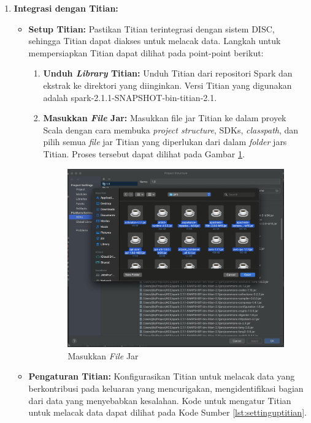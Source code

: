 \begin{enumerate}[topsep=0pt, itemsep=0pt]
  \item \textbf{Integrasi dengan Titian:}
  \begin{itemize}
      \item \textbf{Setup Titian:} Pastikan Titian terintegrasi dengan sistem DISC, sehingga Titian dapat diakses untuk melacak data.
      Langkah untuk mempersiapkan Titian dapat dilihat pada point-point berikut:
      \begin{enumerate}[topsep=0pt]
        \item \textbf{Unduh \emph{Library} Titian:} Unduh Titian dari repositori Spark dan ekstrak ke direktori yang diinginkan. Versi Titian yang digunakan adalah spark-2.1.1-SNAPSHOT-bin-titian-2.1.
        \item \textbf{Masukkan \emph{File} Jar:} Masukkan file jar Titian ke dalam proyek Scala dengan cara membuka \emph{project structure}, SDKs, \emph{classpath}, dan pilih semua 
        \emph{file} jar Titian yang diperlukan dari dalam \emph{folder} jars Titian. Proses tersebut dapat dilihat
        pada Gambar \ref{fig:masukkanfilejar}.

        \begin{figure}[H]
          \centering
          \includegraphics[scale=0.16]{gambar/MasukkanFileJar.png}
        
          \caption{Masukkan \emph{File} Jar}
          \label{fig:masukkanfilejar}
        \end{figure}
      \end{enumerate}
      \item \textbf{Pengaturan Titian:} Konfigurasikan Titian untuk melacak data yang berkontribusi pada keluaran yang mencurigakan, mengidentifikasi bagian dari data yang menyebabkan kesalahan.
      Kode untuk mengatur Titian untuk melacak data dapat dilihat pada Kode Sumber \ref{lst:settinguptitian}.


\end{itemize}
\end{enumerate}
